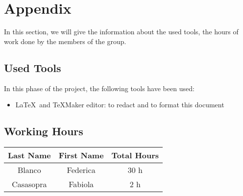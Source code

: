 \section{Appendix} \label{sec:app}
In this section, we will give the information about the used tools, the hours of work done by the members of the group.

\subsection{Used Tools} \label{tools}

In this phase of the project, the following tools have been used:

\begin{itemize}
	\item \LaTeX\ and TeXMaker editor: to redact and to format this document
\end{itemize}

\subsection{Working Hours} \label{worked}

\begin{table}[htbp]
\begin{center}
\begin{tabular}[t]{ccc}

\hline
\textbf{Last Name} & \textbf{First Name} & \textbf{Total Hours} \\
\hline
Blanco & Federica &  30 h\\
\hline
Casasopra & Fabiola &  2 h\\
\hline

\end{tabular}
\end{center}
\end{table}


